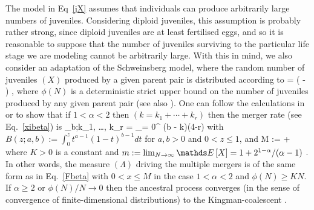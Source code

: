 \documentclass{article}
\begin{document}
The model in Eq~\eqref{jX} assumes that individuals can produce arbitrarily
large numbers of juveniles. Considering diploid juveniles, this assumption is
probably rather strong, since diploid juveniles are at least fertilised eggs,
and so it is reasonable to suppose that the number of juveniles surviving to
the  particular life stage we are modeling  cannot be arbitrarily large.  With
this in mind, we also consider an adaptation of the Schweinsberg model, where
the random number of juveniles $(X)$ produced by a   given parent pair  is
distributed according to \be\label{jtr}  =   
  \left(  -
  \right) , \ee where $\phi(N)$ is a deterministic strict
upper bound on the number of juveniles produced by  any given parent pair (see
also \citep{Eldon2018}).   One can follow the calculations in
\citep{schweinsberg03} or \citep{BLS15}  to show  that  if $1 < \alpha < 2$
then  $(k = k_1 + \cdots + k_r)$ then the merger rate (see Eq.~\eqref{xibeta})
is
 \be \lambda_{b;k_1, \ldots, k_r} =  \sum_{\ell = 0}^{ (b - k)\wedge (4-r) }
  
\ee
with $B(z;a,b) := \int_0^z
t^{a-1}(1-t)^{b-1}dt$ for  $a,b>0$ and $0< z\le 1$, and \be M :=  
 +  \ee where $K > 0$ is a
constant and  $m := \lim_{N\to \infty} \EE{X} = 1 + 2^{1-\alpha}/(\alpha - 1)$
\citep{CDEE2020,AEKKZ2020}.    In other words,  the measure $(\Lambda)$ driving
the multiple mergers is of the same form as in Eq.~\eqref{Fbeta}  with $0 < x
\le M$ in the case $1 < \alpha < 2$ and $\phi(N) \ge KN$.   If $\alpha \ge 2$
or $\phi(N)/N \to 0$ then  the  ancestral process converges (in the sense of
convergence of  finite-dimensional distributions) to  the Kingman-coalescent
\citep{CDEE2020,AEKKZ2020}.

\begin{comment}%
A coalescent process is a continuous-time Markov process taking values among
the partitions of $\IN := \{1,2, \ldots \}$, such that the restriction to any
finite $n \in \IN $ takes values among partitions of $[n] := \{1, 2, \ldots,
n\}$.  Write $\one{A} = 1$ if $A$ holds, and zero otherwise.   Let $\cP_n$
denote the set of partitions of $[n]$.  In the classical Kingman-coalescent,
the only possible transitions are the mergers of pairs of blocks (elements of a
partition $\pi \in \cP_n$), one pair at a time.  The $n$ leaves (corresponding
to the sampled DNA sequences) are arbitrarily labelled from 1 to $n$, and  the
blocks of a partition represent the common ancestors of the labels of each
block.    The initial state is  (usually) taken as $\{ \{1\}, \ldots, \{n\}\}$,
and the final state, i.e.\ when the most recent common ancester is reached, as
$\{ [n]\}$. A block in a partition of $[n]$ represents an ancestor of the
leaves in the block, i.e.\ the block $\{i_1, \ldots, i_k\}$ in a given
partition of $[n]$ is an ancestor of the $k$ leaves $i_1, \ldots, i_k \in [n]$,
and the leaves  correspond to arbitrarily labelled DNA sequences in the sample.
\end{comment}
\end{document}
